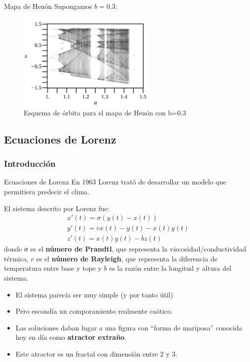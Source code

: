 \documentclass[8pt]{beamer}
\begin{document}
\begin{frame}
\begin{block}{Mapa de Henón}
Supongamos $b=0.3$:
\begin{figure}[hbtp]
\centering
\includegraphics[width = 0.6\textwidth]{img/henon_orb.png}
\caption{Esquema de órbita para el mapa de Henón con b=0.3}
\label{fig:henon_orb}
\end{figure}
\end{block}
\end{frame}

\subsection{Ecuaciones de Lorenz}

\subsubsection{Introducción}
\begin{frame}
\begin{block}{Ecuaciones de Lorenz}
En 1963 Lorenz trató de desarrollar un modelo que permitiera predecir el clima.

El sistema descrito por Lorenz fue:
\[\begin{array}{l}
x'(t) = σ(y(t)-x(t)) \\
y'(t) = rx(t)-y(t)-x(t)y(t)\\
z'(t) = x(t)y(t)-bz(t)
\end{array}\]
donde σ es el \textbf{número de Prandtl}, que representa la viscosidad/conductividad térmica, $r$ es el \textbf{número de Rayleigh}, que representa la diferencia de temperatura entre base y tope y $b$ es la razón entre la longitud y altura del sistema.
\end{block}

\begin{itemize}
\item El sistema parecía ser muy simple (y por tanto útil)
\item Pero escondía un comporamiento realmente caótico.
\item Las soluciones daban lugar a una figura con ``forma de mariposa'' conocida hoy en día como \textbf{atractor extraño}.
\item Este atractor es un fractal con dimensión entre 2 y 3.
\end{itemize}
\end{frame}
\end{document}
